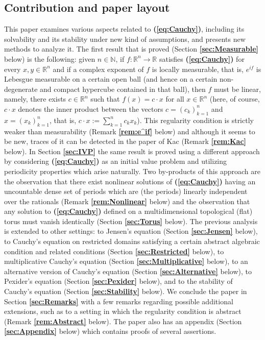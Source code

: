 \documentclass[12 pt]{amsart}
\theoremstyle{definition}
\newcommand{\R}{\mathbb{R}}
\newcommand{\N}{\mathbb{N}}
\newcommand{\bref}[1]{\textbf{\ref{#1}}} %
\newcommand{\beqref}[1]{\textbf{(\ref{#1})}} %
\begin{document}
 \subsection{Contribution and paper layout} 
 This paper examines various aspects related to \beqref{eq:Cauchy}, including its solvability and its stability under new kind of assumptions, and presents new methods to analyze it. The first result that is 
 proved (Section \bref{sec:Measurable} below) is the following: 
 given $n\in\N$, if $f:\R^n\to \R$ satisfies \beqref{eq:Cauchy} for every $x,y\in\R^n$ and if a complex exponent of $f$ is locally  measurable, 
  that is,  $e^{if}$ is Lebesgue measurable on a certain open ball (and hence on a certain non-degenerate and compact hypercube contained in that ball), then $f$ must be linear,  
 namely, there exists $c\in\R^n$ such that $f(x)=c\cdot x$ for all $x\in\R^n$   
 (here, of course,  $c\cdot x$ denotes the inner product between the vectors $c=(c_k)_{k=1}^n$  and $x=(x_k)_{k=1}^n$, that is, $c\cdot x:=\sum_{k=1}^n c_k x_k$). This regularity condition is strictly weaker than measurability (Remark \bref{rem:e^if} below) and although it seems to be new, traces of it can be detected in the paper of Kac \cite{Kac} (Remark \bref{rem:Kac} below). In Section \bref{sec:IVP} 
 the same result is proved using a different approach by considering  \beqref{eq:Cauchy} as an initial value problem and utilizing periodicity properties which arise naturally. 
 Two by-products of this approach are the observation that there exist nonlinear solutions of \beqref{eq:Cauchy} having an uncountable dense set of periods which are (the periods) linearly  independent over the rationals (Remark \bref{rem:Nonlinear} below) and the observation that any  solution to \beqref{eq:Cauchy} 
 defined on a multidimensional topological (flat) torus  must vanish identically (Section \bref{sec:Torus} below).  
The previous analysis is extended to other settings: 
 to Jensen's equation  (Section \bref{sec:Jensen} below), 
 to Cauchy's equation on restricted domains 
 satisfying a certain abstract algebraic condition and related conditions (Section \bref{sec:Restricted} below), 
 to multiplicative Cauchy's equation (Section \bref{sec:Multiplicative} below), 
  to an alternative version of Cauchy's equation 
 (Section \bref{sec:Alternative} below), to Pexider's equation (Section \bref{sec:Pexider} below), 
and to the stability of Cauchy's equation (Section \bref{sec:Stability} below). 
We conclude the paper in Section \bref{sec:Remarks} with a few remarks regarding possible additional extensions, 
such as to a setting in which the  regularity condition is abstract (Remark \bref{rem:Abstract} below). The paper also has an appendix (Section \bref{sec:Appendix} below) which contains proofs of several assertions. 
  
\end{document}
